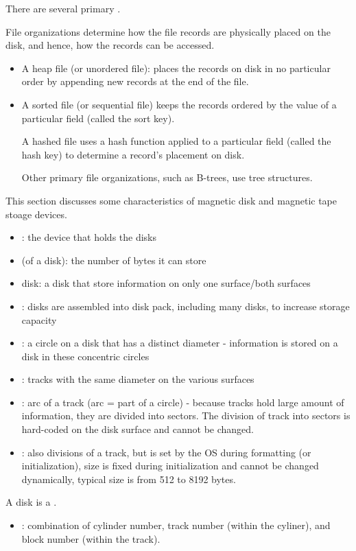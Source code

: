       \par There are several primary .
      \par File organizations determine how the file records are physically placed on the disk, and hence, how the records can be accessed.
      \begin{itemize}
        \item A heap file (or unordered file): places the records on disk in no particular order by appending new records at the end of the file.
        \item A sorted file (or sequential file) keeps the records ordered by the value of a particular field (called the sort key).
        \par A hashed file uses a hash function applied to a particular field (called the hash key) to determine a record’s placement on disk.
        \par Other primary file organizations, such as B-trees, use tree structures.
      \end{itemize}

  \par This section discusses some characteristics of magnetic disk and magnetic tape stoage devices.

      \begin{itemize}
        \item {}: the device that holds the disks
        \item {} (of a disk): the number of bytes it can store
        \item {} disk: a disk that store information on only one surface/both surfaces
        \item {}: disks are assembled into disk pack, including many disks, to increase storage capacity
        \item {}: a circle on a disk that has a distinct diameter - information is stored on a disk in these concentric circles
        \item {}: tracks with the same diameter on the various surfaces
        \item {}: arc of a track (arc = part of a circle) - because tracks hold large amount of information, they are divided into sectors. The division of track into sectors is hard-coded on the disk surface and cannot be changed.
        \item {}: also divisions of a track, but is set by the OS during formatting (or initialization), size is fixed during initialization and cannot be changed dynamically, typical size is from 512 to 8192 bytes. 
      \end{itemize}
      \par A disk is a .
      \begin{itemize}
        \item {}: combination of cylinder number, track number (within the cyliner), and block number (within the track).
      \end{itemize}

